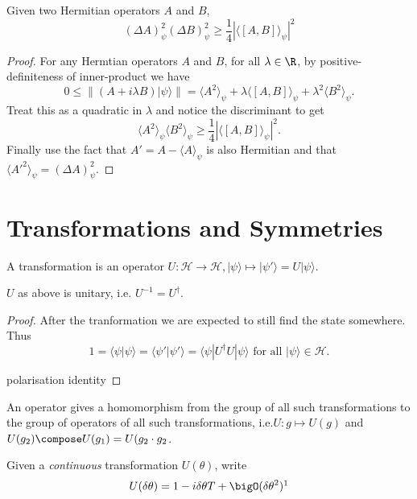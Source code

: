 \documentclass[a4paper]{article}
\renewcommand*{\H}{\mathcal{H}}
\theoremstyle{definition}
\begin{document}
\begin{prop}
  Given two Hermitian operators \(A\) and \(B\),
  \[
    (\Delta A)_\psi^2(\Delta B)_\psi^2 \geq \frac{1}{4}|\langle[A,B]\rangle_\psi|^2
  \]
\end{prop}

\begin{proof}
  For any Hermtian operators \(A\) and \(B\), for all \(\lambda \in \R\), by positive-definiteness of inner-product we have
  \[
    0 \leq \|(A+i\lambda B)|\psi\rangle\| = \langle A^2\rangle_\psi + \lambda\langle[A,B]\rangle_\psi + \lambda^2\langle B^2\rangle_\psi.
  \]
  Treat this as a quadratic in \(\lambda\) and notice the discriminant to get
  \[
    \langle A^2\rangle_\psi \langle B^2\rangle_\psi \geq \frac{1}{4}|\langle[A,B]\rangle_\psi|^2.
  \]
  Finally use the fact that \(A'=A-\langle A\rangle_\psi\) is also Hermitian and that \(\langle A'^2\rangle_\psi = (\Delta A)_\psi^2\).
\end{proof}

\section{Transformations and Symmetries}

A transformation is an operator \(U:\H\to \H, |\psi\rangle\mapsto |\psi'\rangle = U|\psi\rangle\).

\begin{prop}
  \(U\) as above is unitary, i.e. \(U^{-1} = U^\dag\).
\end{prop}

\begin{proof}
  After the tranformation we are expected to still find the state somewhere. Thus
  \[
    1 = \langle \psi|\psi\rangle = \langle \psi'|\psi' \rangle = \langle \psi |U^\dag U|\psi \rangle \text{ for all } |\psi\rangle \in \H.
  \]

  polarisation identity
\end{proof}

An operator gives a homomorphism from the group of all such transformations to the group of operators of all such transformations, i.e.\(U: g\mapsto U(g)\) and \(U(g_2)\compose U(g_1) = U(g_2\cdot g_2\).

\begin{defi}[Generator]
  Given a \emph{continuous} transformation \(U(\theta)\), write
  \[
    U(\delta\theta) = 1 - i \delta\theta T + \bigO(\delta\theta^2)\footnotemark
  \]
\end{defi}
\end{document}
